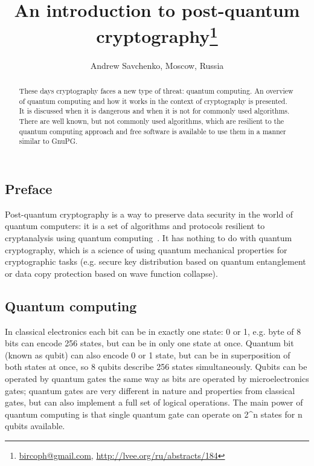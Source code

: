 \documentclass[10pt, a5paper]{article}
\begin{document}
\title{An introduction to post-quantum cryptography\footnote{\url{bircoph@gmail.com}, \url{http://lvee.org/ru/abstracts/184}}}
\author{Andrew Savchenko, Moscow, Russia}
\maketitle
\begin{abstract}
These days cryptography faces a new type of threat: quantum
computing. An overview of quantum computing and how it works in the context of cryptography is presented. It is discussed when it is dangerous and when it is not for commonly used algorithms. There are well known, but not commonly used algorithms, which are resilient to the quantum computing approach and free \linebreak software is available to use them in a manner similar to GnuPG.
\end{abstract}
\subsection*{Preface}

Post-quantum cryptography is a way to preserve data security in the world of quantum computers: it is a set of algorithms and protocols resilient to cryptanalysis using quantum computing~\cite{Savchenko1}. It has nothing to do with quantum cryptography, which is a science of using quantum mechanical properties for cryptographic tasks (e.g. secure key \linebreak distribution based on quantum entanglement or data copy protection based on wave function collapse).

\subsection*{Quantum computing}

In classical electronics each bit can be in exactly one state: 0 or 1, e.g. byte of 8 bits can encode 256 states, but can be in only one state at once. Quantum bit (known as qubit) can also encode 0 or 1 state, but can be in superposition of both states at once, so 8 qubits describe 256 states simultaneously. Qubits can be operated by quantum gates the same way as bits are operated by microelectronics gates; quantum gates are very different in nature and properties from classical gates, but can also implement a full set of logical operations. The main power of quantum computing is that single quantum gate can operate on 2\^{}n states for n qubits available.
\end{document}
